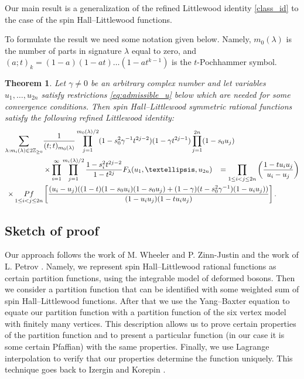 \documentclass[11pt]{article}
\newtheorem{theorem}[theo]{Theorem}
\theoremstyle{definition}
\newcommand{\pf}{\mathop{\rm Pf}}
\begin{document}
Our main result is a generalization of the refined Littlewood identity \eqref{class_id} to the case of the spin Hall--Littlewood functions. 

To formulate the result we need some notation given below. Namely, $m_0(\lambda)$ is the number of parts in signature $\lambda$ equal to zero, and 
$(a;t)_k=(1-a)(1-at)\ldots(1-at^{k-1})$ is the $t$-Pochhammer symbol.
\begin{theorem} \label{lit_id} 
	Let $\gamma\ne0$ be an arbitrary complex number and let variables $u_1, \dots, u_{2n}$ satisfy restrictions \eqref{eq:admissible_u} below which are needed for some convergence conditions.
	Then spin Hall--Littlewood symmetric rational functions satisfy the following refined Littlewood identity:
	\begin{equation} \label{littlewood_id}
	\begin{split}
	\sum_{\lambda: m_{i}(\lambda) \in 2 \mathbb{Z}_{\geq 0}} &\frac{1}{( t; t)_{m_{0}(\lambda)}} \prod_{j = 1}^{m_{0}(\lambda) / 2} (1 - s_{0}^2 \gamma^{-1} t^{2j - 2})(1 - \gamma t^{2j-1})  \prod_{j=1}^{2n} (1 - s_0 u_j)		\\&\times
	\prod_{i = 1}^{\infty} \prod_{j = 1}^{m_{i}(\lambda) / 2} \frac{1 - s_{i}^2 t^{2j - 2}}{1 - t^{2j}} F_{\lambda} (u_1, \dots, u_{2n})
	\; \;\;
	= 
	\prod_{1 \leq i<j \leq 2n}
	\left(
	\frac{1-t u_i u_j}{u_i - u_j}
	\right)
	\\\times
	\pf_{1\leq i < j \leq 2n}&
	\left[
	\frac{ (u_i - u_j)((1 - t)(1 - s_0 u_i)(1- s_0 u_j) + (1 - \gamma)(t-s_{0}^{2}\gamma^{-1})(1-u_i u_j))}
	{(1-u_i u_j) (1-t u_i u_j)}
	\right].
	\end{split}
	\end{equation}
\end{theorem}


\subsection{Sketch of proof}
Our approach follows the work of M. Wheeler and P. Zinn-Justin \cite{WZJ16} and the work of L. Petrov \cite{Pet21}. Namely, we represent spin Hall--Littlewood rational functions as certain partition functions, using the integrable model of deformed bosons. 
Then we consider a partition function that can be identified with some weighted sum of spin Hall--Littlewood functions. After that we use the Yang--Baxter equation to equate our partition function with a partition function of the six vertex model with finitely many vertices. This description allows us to prove certain properties of the partition function and to present a particular function (in our case it is some certain Pfaffian) with the same properties.
Finally, we use Lagrange interpolation to verify that our properties determine the function uniquely. This technique goes back to Izergin and Korepin \cite{Ize87,KBI93}.
\end{document}
